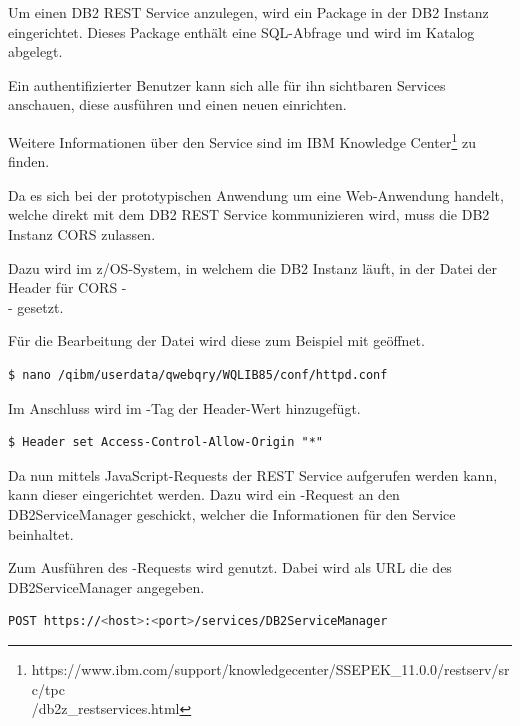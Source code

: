 Um einen DB2 REST Service anzulegen, wird ein Package in der DB2 Instanz eingerichtet. Dieses Package enthält eine
SQL-Abfrage und wird im  Katalog abgelegt.

Ein authentifizierter Benutzer kann sich alle für ihn sichtbaren Services anschauen, diese ausführen und einen neuen
einrichten.

Weitere Informationen über den Service sind im IBM Knowledge
Center\footnote{https://www.ibm.com/support/knowledgecenter/SSEPEK\_11.0.0/restserv/src/tpc\\/db2z\_restservices.html} zu
finden.

Da es sich bei der prototypischen Anwendung um eine Web-Anwendung handelt, welche direkt mit dem DB2 REST Service
kommunizieren wird, muss die DB2 Instanz CORS zulassen.

Dazu wird im z/OS-System, in welchem die DB2 Instanz läuft, in der Datei 
der Header für CORS - \\  - gesetzt.

Für die Bearbeitung der Datei wird diese zum Beispiel mit  geöffnet.

\begin{lstlisting}[language=bash, caption=Bearbeiten der Konfigurationsdatei, label=Bearbeiten der Konfigurationsdatei]
   $ nano /qibm/userdata/qwebqry/WQLIB85/conf/httpd.conf
\end{lstlisting}

Im Anschluss wird im -Tag der Header-Wert hinzugefügt.

\begin{lstlisting}[caption=Header für CORS setzen, label=Header für CORS setzen]
   $ Header set Access-Control-Allow-Origin "*"
\end{lstlisting}

Da nun mittels JavaScript-Requests der REST Service aufgerufen werden kann, kann dieser eingerichtet werden. Dazu wird
ein -Request an den DB2ServiceManager geschickt, welcher die Informationen für den Service beinhaltet.

Zum Ausführen des -Requests wird  genutzt. Dabei wird als URL die des DB2ServiceManager angegeben.

\begin{lstlisting}[language=bash, caption=DB2 REST Service erstellen, label=DB2 REST Service erstellen]
   POST https://<host>:<port>/services/DB2ServiceManager
\end{lstlisting}


